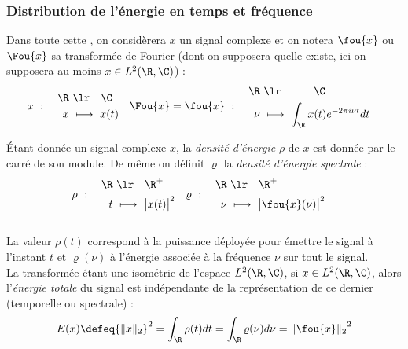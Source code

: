 \subsubsection{Distribution de l'énergie en temps et fréquence}\label{subsec:distrib_temp-freq}

Dans toute cette , on considèrera $x$ un signal complexe et on notera $\fou{x}$ ou $\Fou{x}$ sa transformée de Fourier (dont on supposera quelle existe, ici on supposera au moins $x\in L^2(\R, \C)$) :
\begin{align*}
	x\ &:\quad \begin{aligned}\R\ &\lr\quad \C \\ x\ &\longmapsto\ x(t)
	\end{aligned}  &  \Fou{x}=\fou{x}\ &:\quad \begin{aligned}\R\ &\lr\qquad\quad \C \\ \nu\ &\longmapsto\ \int_\R x(t)e^{-2\pi i \nu t}dt
	\end{aligned}
\end{align*}

\begin{definition}\label{def:densi_dE}
	Étant donnée un signal complexe $x$, la \emph{densité d'énergie} $\rho$ de $x$ est donnée par le carré de son module. De même on définit $\varrho$ la \emph{densité d'énergie spectrale} :
		\begin{align}\label{eq:densi_dE}
			\rho\ &:\quad \begin{aligned}\R\ &\lr\quad \R^+ \\ t\ &\longmapsto\ \big|x(t)\big|^2 \end{aligned}  
			&
			\varrho\ &:\quad \begin{aligned}\R\ &\lr\quad \R^+ \\ \nu\ &\longmapsto\ \big|\fou{x}(\nu)\big|^2 \end{aligned}
		\end{align}
	\\
	La valeur $\rho(t)$ correspond à la puissance déployée pour émettre le signal à l'instant $t$ et $\varrho(\nu)$ à l'énergie associée à la fréquence $\nu$ sur tout le signal. 
	\\
	La transformée étant une isométrie de l'espace $L^2(\R,\C)$, si $x\in L^2(\R,\C)$, alors l'\emph{énergie totale} du signal est indépendante de la représentation de ce dernier (temporelle ou spectrale) :
	\begin{equation}\label{eq:parceval}
		E(x) \defeq {\|x\|_2}^2 = \int_\R \rho(t) dt = \int_\R \varrho(\nu) d\nu = {\|\fou{x}\|_2}^2
	\end{equation}
\end{definition}

